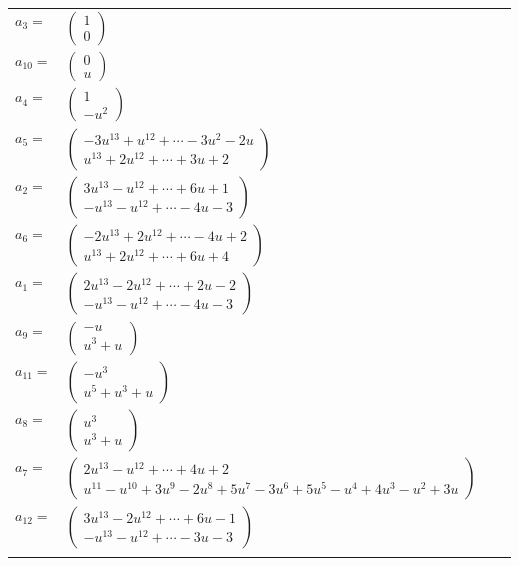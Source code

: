 \documentclass[1p]{elsarticle_modified}
\theoremstyle{definition}
\begin{document}
\begin{tabular}{m{7pt} m{180pt} m{7pt} m{180pt} }
\flushright $a_{3}=$&$\begin{pmatrix}1\\0\end{pmatrix}$ \\
\flushright $a_{10}=$&$\begin{pmatrix}0\\u\end{pmatrix}$ \\
\flushright $a_{4}=$&$\begin{pmatrix}1\\- u^2\end{pmatrix}$ \\
\flushright $a_{5}=$&$\begin{pmatrix}-3 u^{13}+u^{12}+\cdots-3 u^2-2 u\\u^{13}+2 u^{12}+\cdots+3 u+2\end{pmatrix}$ \\
\flushright $a_{2}=$&$\begin{pmatrix}3 u^{13}- u^{12}+\cdots+6 u+1\\- u^{13}- u^{12}+\cdots-4 u-3\end{pmatrix}$ \\
\flushright $a_{6}=$&$\begin{pmatrix}-2 u^{13}+2 u^{12}+\cdots-4 u+2\\u^{13}+2 u^{12}+\cdots+6 u+4\end{pmatrix}$ \\
\flushright $a_{1}=$&$\begin{pmatrix}2 u^{13}-2 u^{12}+\cdots+2 u-2\\- u^{13}- u^{12}+\cdots-4 u-3\end{pmatrix}$ \\
\flushright $a_{9}=$&$\begin{pmatrix}- u\\u^3+u\end{pmatrix}$ \\
\flushright $a_{11}=$&$\begin{pmatrix}- u^3\\u^5+u^3+u\end{pmatrix}$ \\
\flushright $a_{8}=$&$\begin{pmatrix}u^3\\u^3+u\end{pmatrix}$ \\
\flushright $a_{7}=$&$\begin{pmatrix}2 u^{13}- u^{12}+\cdots+4 u+2\\u^{11}- u^{10}+3 u^9-2 u^8+5 u^7-3 u^6+5 u^5- u^4+4 u^3- u^2+3 u\end{pmatrix}$ \\
\flushright $a_{12}=$&$\begin{pmatrix}3 u^{13}-2 u^{12}+\cdots+6 u-1\\- u^{13}- u^{12}+\cdots-3 u-3\end{pmatrix}$\\&\end{tabular}
\end{document}
